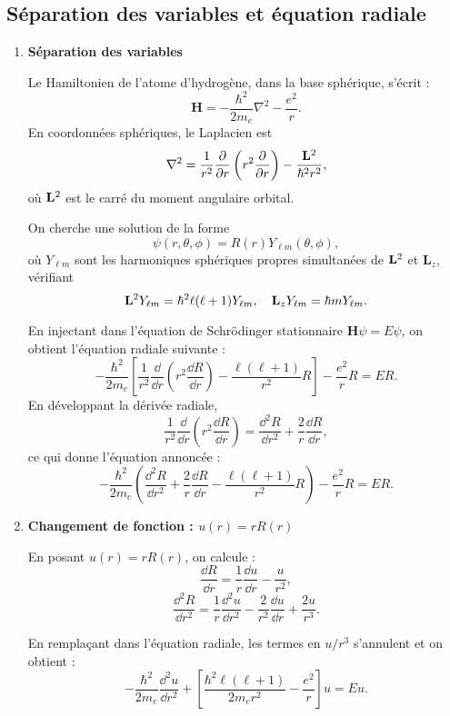 \documentclass[a4paper,10pt]{report}
\begin{document}
	\subsection{Séparation des variables et équation radiale}
	
	\begin{enumerate}
		\item \textbf{Séparation des variables}
		
		Le Hamiltonien de l’atome d’hydrogène, dans la base sphérique, s’écrit :
		\[
		\textbf{H} = -\frac{\hbar^2}{2m_e} \nabla^2 - \frac{e^2}{r}.
		\]
		En coordonnées sphériques, le Laplacien est
		\[
		\nabla^2 = \frac{1}{r^2} \frac{\partial}{\partial r}\left( r^2 \frac{\partial}{\partial r} \right) - \frac{\vb{L}^2}{\hbar^2 r^2},
		\]
		où $\vb{L}^2$ est le carré du moment angulaire orbital.
		
		On cherche une solution de la forme 
		\[
		\psi(r, \theta, \phi) = R(r) Y_{\ell m}(\theta, \phi),
		\]
		où $Y_{\ell m}$ sont les harmoniques sphériques propres simultanées de $\vb{L}^2$ et $\textbf{L}_z$, vérifiant
		\[
		\vb{L}^2 Y_{\ell m} = \hbar^2 \ell(\ell+1) Y_{\ell m}, \quad \textbf{L}_z Y_{\ell m} = \hbar m Y_{\ell m}.
		\]
		
		En injectant dans l'équation de Schrödinger stationnaire $\textbf{H}\psi = E\psi$, on obtient l’équation radiale suivante :
		\[
		-\frac{\hbar^2}{2m_e} \left[ \frac{1}{r^2} \frac{\dd}{\dd r} \left( r^2 \frac{\dd R}{\dd r} \right) - \frac{\ell(\ell+1)}{r^2} R \right] - \frac{e^2}{r} R = E R.
		\]
		En développant la dérivée radiale,
		\[
		\frac{1}{r^2} \frac{\dd}{\dd r} \left( r^2 \frac{\dd R}{\dd r} \right) = \frac{\dd^2 R}{\dd r^2} + \frac{2}{r} \frac{\dd R}{\dd r},
		\]
		ce qui donne l’équation annoncée :
		\[
		-\frac{\hbar^2}{2m_e} \left( \frac{\dd^2 R}{\dd r^2} + \frac{2}{r} \frac{\dd R}{\dd r} - \frac{\ell(\ell+1)}{r^2} R \right) - \frac{e^2}{r} R = E R.
		\]
		
		\item \textbf{Changement de fonction : $u(r) = r R(r)$}
		
		En posant $u(r) = r R(r)$, on calcule :
		\[
		\frac{\dd R}{\dd r} = \frac{1}{r} \frac{\dd u}{\dd r} - \frac{u}{r^2},
		\]
		\[
		\frac{\dd^2 R}{\dd r^2} = \frac{1}{r} \frac{\dd^2 u}{\dd r^2} - \frac{2}{r^2} \frac{\dd u}{\dd r} + \frac{2u}{r^3}.
		\]
		
		En remplaçant dans l’équation radiale, les termes en $u/r^3$ s’annulent et on obtient :
		\[
		-\frac{\hbar^2}{2m_e} \frac{\dd^2 u}{\dd r^2} + \left[ \frac{\hbar^2 \ell(\ell+1)}{2 m_e r^2} - \frac{e^2}{r} \right] u = E u.
		\]
		

\end{enumerate}
\end{document}
